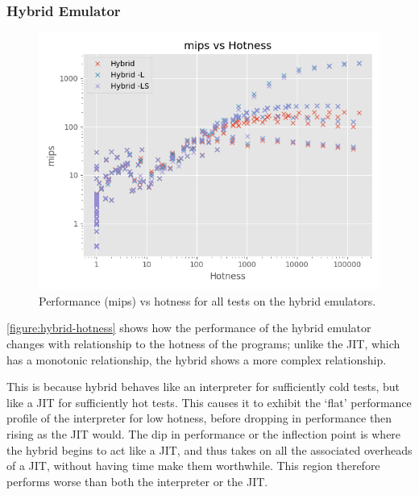 \subsubsection{Hybrid Emulator}
\label{section:perf-hybrid}





\begin{figure}[H]
    \centering
    \includegraphics[scale=0.75]{output/graphs/scatter/hybrid/hotness.png}
    \caption{Performance (mips) vs hotness for all tests on the hybrid emulators.}
    \label{figure:hybrid-hotness}
\end{figure}

\autoref{figure:hybrid-hotness} shows how the performance of the hybrid emulator changes with relationship to the hotness of the programs; unlike the JIT, which has a monotonic relationship, the hybrid shows a more complex relationship.

This is because hybrid behaves like an interpreter for sufficiently cold tests, but like a JIT for sufficiently hot tests. This causes it to exhibit the `flat' performance profile of the interpreter for low hotness, before dropping in performance then rising as the JIT would. The dip in performance or the inflection point is where the hybrid begins to act like a JIT, and thus takes on all the associated overheads of a JIT, without having time make them worthwhile. This region therefore performs worse than both the interpreter or the JIT.

